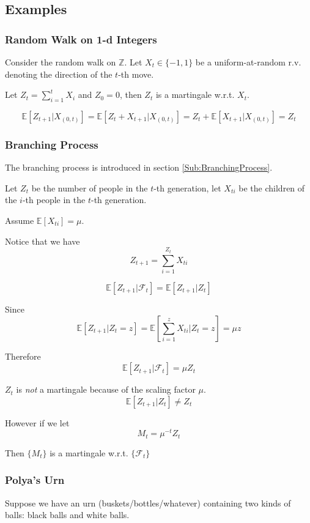     \subsection{Examples}
        \subsubsection{Random Walk on 1-d Integers}
        Consider the random walk on $\mathbb{Z}$. Let $X_t \in \{-1, 1\}$ be a uniform-at-random r.v. denoting the direction of the $t$-th move.

        Let $Z_t = \sum_{i=1}^tX_i$ and $Z_0=0$, then $Z_t$ is a martingale w.r.t. $X_t$.

        \[ \mathbb{E}[Z_{t+1}|X_{(0,t)}] = \mathbb{E}[Z_t + X_{t+1}|X_{(0,t)}] = Z_t + \mathbb{E}[X_{t+1}|X_{(0,t)}] = Z_t \]

        \subsubsection{Branching Process}
        The branching process is introduced in section \ref{Sub:BranchingProcess}.

        Let $Z_t$ be the number of people in the $t$-th generation, let $X_{ti}$ be the children of the $i$-th people in the $t$-th generation.

        Assume $\mathbb{E}[X_{ti}] = \mu$.

        Notice that we have
        \[ Z_{t+1} = \sum_{i=1}^{Z_t}X_{ti} \]

        \[ \mathbb{E}[Z_{t+1}|\mathcal{F}_t] = \mathbb{E}[Z_{t+1}|Z_t] \]

        Since
        \[ \mathbb{E}[Z_{t+1}|Z_t=z] = \mathbb{E}[\sum_{i=1}^zX_{ti}|Z_t=z] = \mu z \]

        Therefore
        \[ \mathbb{E}[Z_{t+1}|\mathcal{F}_t] = \mu Z_t \]

        $Z_t$ is \emph{not} a martingale because of the scaling factor $\mu$.
        \[ \mathbb{E}[Z_{t+1}|Z_t] \neq Z_t \]

        However if we let
        \[ M_t = \mu^{-t}Z_t \]

        Then $\{M_t\}$ is a martingale w.r.t. $\{\mathcal{F}_t\}$

        \subsubsection{Polya's Urn}
        Suppose we have an urn (buskets/bottles/whatever) containing two kinds of balls: black balls and white balls.
        
